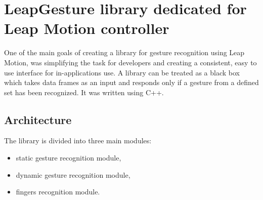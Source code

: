 
\chapter{LeapGesture library dedicated for Leap Motion controller}\label{libraryChapter}


One of the main goals of creating a library for gesture recognition using Leap Motion, was simplifying the task for developers and creating a consistent, easy to use interface for in-applications use. A library can be treated as a black box which takes data frames as an input and responds only if a gesture from a defined set has been recognized. It was written using C++.

\section{Architecture} \label{architectureSection}

The library is divided into three main modules:
\begin{itemize}
\item static gesture recognition module,
\item dynamic gesture recognition module,
\item fingers recognition module.
\end{itemize}

